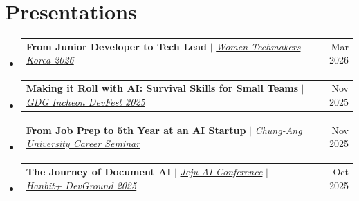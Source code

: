 \documentclass[letterpaper,11pt]{article}
\makeatletter
\newcommand{\resumeProjectHeading}[2]{
    \item
    \begin{tabular*}{0.97\textwidth}{l@{\extracolsep{\fill}}r}
      \small #1 & #2 \\
    \end{tabular*}\vspace{-7pt}
}
\newcommand{\resumeSubHeadingListStart}{\begin{itemize}[leftmargin=*]}
\newcommand{\resumeSubHeadingListEnd}{\end{itemize}}
\makeatother
\begin{document}
\section{Presentations}
  \resumeSubHeadingListStart
    \resumeProjectHeading
      {\textbf{From Junior Developer to Tech Lead} $|$ \emph{\href{https://www.slideshare.net/slideshow/from-junior-developer-to-tech-lead-leveraging-ai-for-leadership-and-team-impact/286718141}{Women Techmakers Korea 2026}}}{Mar 2026}
    \resumeProjectHeading
      {\textbf{Making it Roll with AI: Survival Skills for Small Teams} $|$ \emph{\href{https://www.slideshare.net/slideshow/gdg-incheon-2025-ai/284715174}{GDG Incheon DevFest 2025}}}{Nov 2025}
    \resumeProjectHeading
      {\textbf{From Job Prep to 5th Year at an AI Startup} $|$ \emph{\href{https://www.slideshare.net/slideshow/2025-ai-5/284715261}{Chung-Ang University Career Seminar}}}{Nov 2025}
    \resumeProjectHeading
      {\textbf{The Journey of Document AI} $|$ \emph{\href{https://www.slideshare.net/slideshow/mlops-api-solarbox-document-ai/283755773}{Jeju AI Conference}} $|$ \emph{\href{https://www.hanbit.co.kr/product/C2486251278}{Hanbit+ DevGround 2025}}}{Oct 2025}
  \resumeSubHeadingListEnd


\end{document}
